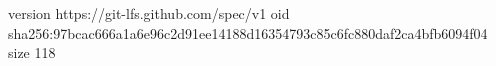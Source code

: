 version https://git-lfs.github.com/spec/v1
oid sha256:97bcac666a1a6e96c2d91ee14188d16354793c85c6fc880daf2ca4bfb6094f04
size 118

